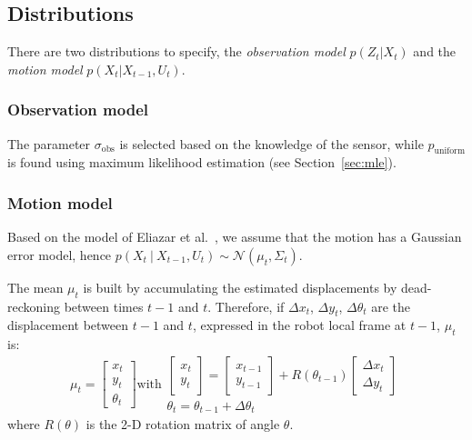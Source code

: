 \documentclass[letterpaper, 10pt, conference]{ieeeconf}
\newcommand{\sect}[1]{Section~\ref{sec:#1}}
\begin{document}
\subsection{Distributions}

There are two distributions to specify, the \emph{observation model} $p(Z_t | X_t)$ and the \emph{motion model} $p(X_t|X_{t-1}, U_t)$.

\subsubsection{Observation model}


The parameter $\sigma_\mathrm{obs}$ is selected based on the knowledge of the sensor, while $p_\mathrm{uniform}$ is found using maximum likelihood estimation (see \sect{mle}).

\subsubsection{Motion model}

Based on the model of Eliazar et al.~\cite{eliazar2004motionmodel}, we assume that the motion has a Gaussian error model, hence $p(X_t~|~X_{t-1}, U_{t})\sim\mathcal{N}(\mu_t,\Sigma_t)$.

The mean $\mu_t$ is built by accumulating the estimated displacements by dead-reckoning between times $t-1$ and $t$.
Therefore, if $\Delta x_t$, $\Delta y_t$, $\Delta \theta_t$ are the displacement between $t-1$ and $t$, expressed in the robot local frame at $t-1$, $\mu_t$ is:
\begin{equation}
\mu_t =
\left[ \begin{array}{c} x_t \\ y_t \\ \theta_t \end{array} \right]
\text{with}
\begin{array}{c}
\left[ \begin{array}{c} x_t \\ y_t \end{array} \right] =
\left[ \begin{array}{c} x_{t-1} \\ y_{t-1} \end{array} \right] +
R(\theta_{t-1})
\left[ \begin{array}{c} \Delta x_{t} \\ \Delta y_{t} \end{array} \right]
\\
\theta_t = \theta_{t-1} + \Delta \theta_t
\end{array}
\end{equation}
where $R(\theta)$ is the 2-D rotation matrix of angle $\theta$.
\end{document}
